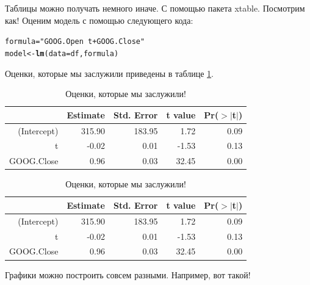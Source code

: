 \documentclass[12pt, a4paper]{article}\usepackage[]{graphicx}\usepackage[]{color}
\makeatletter
\newcommand{\hlstr}[1]{\textcolor[rgb]{0.192,0.494,0.8}{#1}}%
\newcommand{\hlstd}[1]{\textcolor[rgb]{0.345,0.345,0.345}{#1}}%
\newcommand{\hlkwb}[1]{\textcolor[rgb]{0.69,0.353,0.396}{#1}}%
\newcommand{\hlkwc}[1]{\textcolor[rgb]{0.333,0.667,0.333}{#1}}%
\newcommand{\hlkwd}[1]{\textcolor[rgb]{0.737,0.353,0.396}{\textbf{#1}}}%
\newenvironment{kframe}{%
 \def\at@end@of@kframe{}%
 \ifinner\ifhmode%
  \def\at@end@of@kframe{\end{minipage}}%
  \begin{minipage}{\columnwidth}%
 \fi\fi%
 \def\FrameCommand##1{\hskip\@totalleftmargin \hskip-\fboxsep
 \colorbox{shadecolor}{##1}\hskip-\fboxsep
     \hskip-\linewidth \hskip-\@totalleftmargin \hskip\columnwidth}%
 \MakeFramed {\advance\hsize-\width
   \@totalleftmargin\z@ \linewidth\hsize
   \@setminipage}}%
 {\par\unskip\endMakeFramed%
 \at@end@of@kframe}
\newenvironment{knitrout}{}{} %
\makeatother
\begin{document}
Таблицы можно получать немного иначе. С помощью пакета xtable. Посмотрим как! Оценим модель с помощью следующего кода: 

\begin{knitrout}
\color{fgcolor}\begin{kframe}
\begin{alltt}
\hlstd{formula} \hlkwb{=} \hlstr{"GOOG.Open~t+GOOG.Close"}
\hlstd{model} \hlkwb{<-} \hlkwd{lm}\hlstd{(}\hlkwc{data}\hlstd{=df,formula)}
\end{alltt}
\end{kframe}
\end{knitrout}


Оценки, которые мы заслужили приведены в таблице \ref{tab:regress}. 

\begin{table}[ht]
\centering
\begin{tabular}{rrrrr}
  \hline
 & Estimate & Std. Error & t value & Pr($>$$|$t$|$) \\ 
  \hline
(Intercept) & 315.90 & 183.95 & 1.72 & 0.09 \\ 
  t & -0.02 & 0.01 & -1.53 & 0.13 \\ 
  GOOG.Close & 0.96 & 0.03 & 32.45 & 0.00 \\ 
   \hline
\end{tabular}
\caption{Оценки, которые мы заслужили!} 
\label{tab:regress}
\end{table}



\begin{table}[ht]
\centering
\begin{tabular}{rrrrr}
  \hline
 & Estimate & Std. Error & t value & Pr($>$$|$t$|$) \\ 
  \hline
(Intercept) & 315.90 & 183.95 & 1.72 & 0.09 \\ 
  t & -0.02 & 0.01 & -1.53 & 0.13 \\ 
  GOOG.Close & 0.96 & 0.03 & 32.45 & 0.00 \\ 
   \hline
\end{tabular}
\caption{Оценки, которые мы заслужили!} 
\label{tab:regress2}
\end{table}


Графики можно построить совсем разными. Например, вот такой! 
\end{document}
